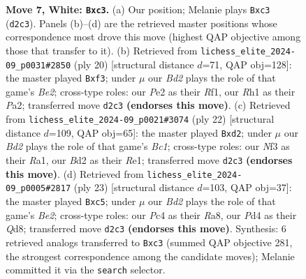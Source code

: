 \documentclass[11pt]{article}
\begin{document}
\begin{figure}[p]
\caption{\textbf{Move 7, White: \texttt{Bxc3}.} (a) Our position; Melanie plays \texttt{Bxc3} (\texttt{d2c3}). Panels (b)--(d) are the retrieved master positions whose correspondence most drove this move (highest QAP objective among those that transfer to it). (b) Retrieved from \texttt{lichess\_elite\_2024-09\_p0031\#2850} (ply 20) [structural distance $d$=71, QAP obj=128]: the master played \texttt{Bxf3}; under $\mu$ our \emph{Bd2} plays the role of that game's \emph{Be2}; cross-type roles: our \emph{P}e2 as their \emph{R}f1, our \emph{R}h1 as their \emph{P}a2; transferred move \texttt{d2c3} \textbf{(endorses this move)}. (c) Retrieved from \texttt{lichess\_elite\_2024-09\_p0021\#3074} (ply 22) [structural distance $d$=109, QAP obj=65]: the master played \texttt{Bxd2}; under $\mu$ our \emph{Bd2} plays the role of that game's \emph{Bc1}; cross-type roles: our \emph{N}f3 as their \emph{R}a1, our \emph{B}d2 as their \emph{R}e1; transferred move \texttt{d2c3} \textbf{(endorses this move)}. (d) Retrieved from \texttt{lichess\_elite\_2024-09\_p0005\#2817} (ply 23) [structural distance $d$=103, QAP obj=37]: the master played \texttt{Bxc5}; under $\mu$ our \emph{Bd2} plays the role of that game's \emph{Be2}; cross-type roles: our \emph{P}c4 as their \emph{R}a8, our \emph{P}d4 as their \emph{Q}d8; transferred move \texttt{d2c3} \textbf{(endorses this move)}. Synthesis: 6 retrieved analogs transferred to \texttt{Bxc3} (summed QAP objective 281, the strongest correspondence among the candidate moves); Melanie committed it via the \texttt{search} selector.}
\label{fig:thought-m12}
\end{figure}

\clearpage
\end{document}

